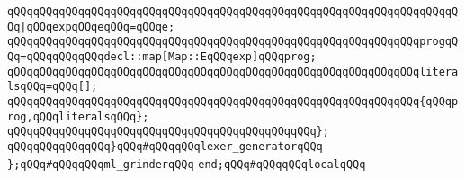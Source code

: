 \newline
\verb|qQQqqQQqqQQqqQQqqQQqqQQqqQQqqQQqqQQqqQQqqQQqqQQqqQQqqQQqqQQqqQQqqQQqqQQq|\verb#|qQQqexpqQQqeqQQq=qQQqe;#\newline
\newline
\verb|qQQqqQQqqQQqqQQqqQQqqQQqqQQqqQQqqQQqqQQqqQQqqQQqqQQqqQQqqQQqqQQqprogqQQq=qQQqqQQqqQQqdecl::map[Map::EqQQqexp]qQQqprog;|\newline
\newline
\verb|qQQqqQQqqQQqqQQqqQQqqQQqqQQqqQQqqQQqqQQqqQQqqQQqqQQqqQQqqQQqqQQqliteralsqQQq=qQQq[];|\newline
\newline
\verb|qQQqqQQqqQQqqQQqqQQqqQQqqQQqqQQqqQQqqQQqqQQqqQQqqQQqqQQqqQQqqQQq{qQQqprog,qQQqliteralsqQQq};|\newline
\newline
\verb|qQQqqQQqqQQqqQQqqQQqqQQqqQQqqQQqqQQqqQQqqQQqqQQq};|\newline
\newline
\verb|qQQqqQQqqQQqqQQq}qQQq#qQQqqQQqlexer_generatorqQQq|\newline
\verb|};qQQq#qQQqqQQqml_grinderqQQq|\newline
\newline
\verb|end;qQQq#qQQqqQQqlocalqQQq|\newline
\newline

